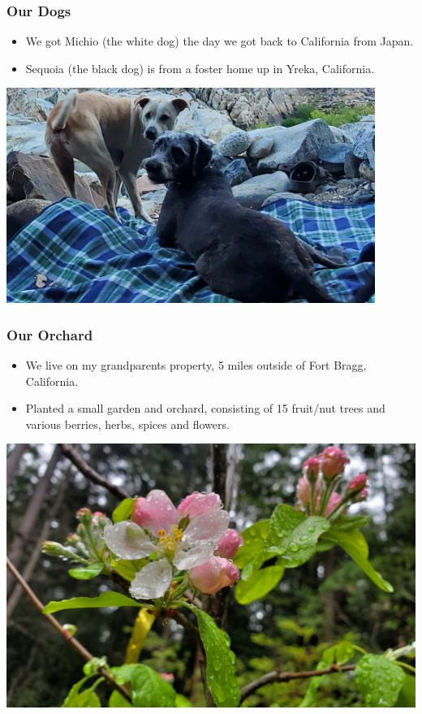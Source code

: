 \documentclass{beamer}
\begin{document}
			\begin{frame}
							\frametitle{Our Dogs}
								\begin{itemize}
					\item We got Michio (the white dog) the day we got back to California from Japan.
					\item Sequoia (the black dog) is from a foster home up in Yreka, California.
				\end{itemize}
				\begin{center}
					\includegraphics[width = 0.9\textwidth]{images/michio and sequoia.png}
				\end{center}
			\end{frame}
		
			\begin{frame}
	\frametitle{Our Orchard}
	\begin{itemize}
		\item We live on my grandparents property, 5 miles outside of Fort Bragg, California.
		\item Planted a small garden and orchard, consisting of 15 fruit/nut trees and various berries, herbs, spices and flowers.   
	\end{itemize}
	\begin{center}
		\includegraphics[width = 1.0\textwidth]{images/flower.png}
	\end{center}
\end{frame}
			
\end{document}
